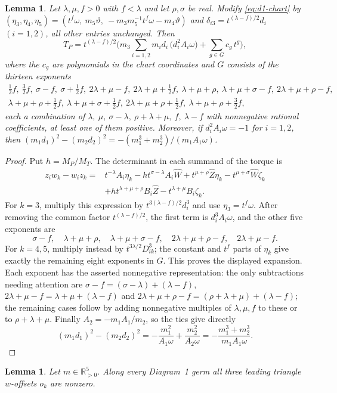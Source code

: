 \documentclass[11pt]{amsart}
\newtheorem{lemma}[theorem]{Lemma}
\theoremstyle{definition}
\theoremstyle{remark}
\newcommand{\Rp}{\mathbb{R}_{>0}}
\begin{document}
{\begin{lemma}\label{lem:d1-torque}
Let $\lambda,\mu,f>0$ with $f<\lambda$ and let $\rho,\sigma$ be real.  Modify
\eqref{eq:d1-chart} by $(\eta_3,\eta_4,\eta_5)=(t^f\omega,\ m_5\vartheta,\
-m_3m_5^{-1}t^f\omega-m_4\vartheta)$ and $\delta_{i3}=t^{(\lambda-f)/2}d_i$ $(i=1,2)$, all other
entries unchanged.  Then
\[
  T_P=t^{(\lambda-f)/2}\Big(m_3\sum_{i=1,2}m_id_i\,\big(d_i^2A_i\omega\big)+\sum_{g\in G}c_g\,t^g\Big),
\]
where the $c_g$ are polynomials in the chart coordinates and $G$ consists of the thirteen
exponents
\[
\begin{gathered}
  \tfrac12f,\ \tfrac32f,\ \sigma-f,\ \sigma+\tfrac12f,\ 2\lambda+\mu-f,\
  2\lambda+\mu+\tfrac12f,\ \lambda+\mu+\rho,\ \lambda+\mu+\sigma-f,\ 2\lambda+\mu+\rho-f,\\
  \lambda+\mu+\rho+\tfrac12f,\ \lambda+\mu+\sigma+\tfrac12f,\ 2\lambda+\mu+\rho+\tfrac12f,\
  \lambda+\mu+\rho+\tfrac32f,
\end{gathered}
\]
each a combination of $\lambda,\ \mu,\ \sigma-\lambda,\ \rho+\lambda+\mu,\ f,\ \lambda-f$ with
nonnegative rational coefficients, at least one of them positive.  Moreover, if
$d_i^2A_i\omega=-1$ for $i=1,2$, then $(m_1d_1)^2-(m_2d_2)^2=-(m_1^3+m_2^3)/(m_1A_1\omega)$.
\end{lemma}}
{\begin{proof}
Put $h=M_P/M_T$.  The determinant in each summand of the torque is
\begin{align*}
 z_iw_k-w_iz_k
 ={}&t^{-\lambda}A_i\eta_k-h t^{\sigma-\lambda}A_i\hat W
       +t^{\mu+\rho}\hat Z\eta_k-t^{\mu+\sigma}\hat W\zeta_k\\
   &+h t^{\lambda+\mu+\rho}B_i\hat Z
       -t^{\lambda+\mu}B_i\zeta_k.
\end{align*}
For $k=3$, multiply this expression by
$t^{3(\lambda-f)/2}d_i^3$ and use $\eta_3=t^f\omega$.
After removing the common factor $t^{(\lambda-f)/2}$, the first term
is $d_i^3A_i\omega$, and the other five exponents are
\[
 \sigma-f,\quad\lambda+\mu+\rho,\quad
 \lambda+\mu+\sigma-f,\quad2\lambda+\mu+\rho-f,\quad2\lambda+\mu-f.
\]
For $k=4,5$, multiply instead by $t^{3\lambda/2}D_{ik}^3$;
the constant and $t^f$ parts of $\eta_k$ give exactly the remaining
eight exponents in $G$.  This proves the displayed expansion.
Each exponent has the asserted nonnegative representation: the only
subtractions needing attention are
$\sigma-f=(\sigma-\lambda)+(\lambda-f)$,
$2\lambda+\mu-f=\lambda+\mu+(\lambda-f)$ and
$2\lambda+\mu+\rho-f=(\rho+\lambda+\mu)+(\lambda-f)$;
the remaining cases follow by adding nonnegative multiples of
$\lambda,\mu,f$ to these or to $\rho+\lambda+\mu$.
Finally $A_2=-m_1A_1/m_2$, so the ties give directly
\[
 (m_1d_1)^2-(m_2d_2)^2
 =-\frac{m_1^2}{A_1\omega}+\frac{m_2^2}{A_2\omega}
 =-\frac{m_1^3+m_2^3}{m_1A_1\omega}.
\]
\end{proof}

}\begin{lemma}\label{lem:d1-central}
Let $m\in\Rp^5$.  Along every Diagram~1 germ all three leading triangle $w$-offsets $o_k$ are
nonzero.
\end{lemma}
\end{document}
